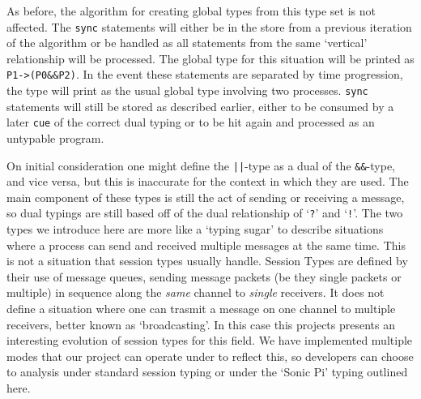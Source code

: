 \documentclass[11pt, abstracton, twoside, titlepage=true]{scrartcl}
\begin{document}
As before, the algorithm for creating global types from this type set is not
affected. The \texttt{sync} statements will either be in the store from a previous
iteration of the algorithm or be handled as all statements from the same `vertical'
relationship will be processed. The global type for this situation will be printed
as \texttt{P1->(P0\&\&P2)}. In the event these statements are separated by time
progression, the type will print as the usual global type involving two processes.
\texttt{sync} statements will still be stored as described earlier, either to be
consumed by a later \texttt{cue} of the correct dual typing or to be hit again
and processed as an untypable program.

On initial consideration one might define the \texttt{||}-type as a dual of the
\texttt{\&\&}-type, and vice versa, but this is inaccurate for the context in which
they are used. The main component of these types is still the act of sending or
receiving a message, so dual typings are still based off of the dual relationship
of `\texttt{?}' and `\texttt{!}'. The two types we introduce here are more like
a `typing sugar' to describe situations where a process can send and received
multiple messages at the same time. This is not a situation that session types
usually handle. Session Types are defined by their use of message queues, sending
message packets (be they single packets or multiple) in sequence along the 
\emph{same} channel to \emph{single} receivers. It does not define a situation
where one can trasmit a message on one channel to multiple receivers, better known 
as `broadcasting'. In this case
this projects presents an interesting evolution of session types for this field.
We have implemented multiple modes that our project can operate under to reflect
this, so developers can choose to analysis under standard session typing or under 
the `Sonic Pi' typing outlined here.
\newpage
\end{document}
